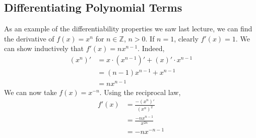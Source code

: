 \subsection{Differentiating Polynomial Terms}
As an example of the differentiability properties we saw last lecture, we can find the derivative of \(f(x) = x^n\) for \(n \in \mathbb Z\), \(n > 0\).
If \(n=1\), clearly \(f'(x) = 1\).
We can show inductively that \(f'(x) = nx^{n-1}\).
Indeed,
\begin{align*}
	(x^n)' & = x \cdot (x^{n-1})' + (x)' \cdot x^{n-1} \\
	       & = (n-1)x^{n-1} + x^{n-1}                  \\
	       & = nx^{n-1}
\end{align*}
We can now take \(f(x) = x^{-n}\).
Using the reciprocal law,
\begin{align*}
	f'(x) & = \frac{-(x^n)'}{(x^n)^2}  \\
	      & = \frac{-nx^{n-1}}{x^{2n}} \\
	      & = -nx^{-n-1}
\end{align*}

